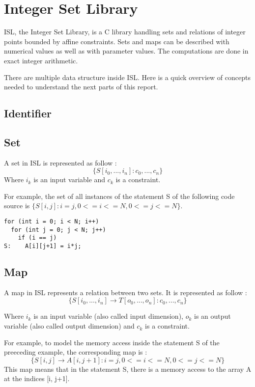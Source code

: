 \chapter{Integer Set Library}\label{ch:ISL}

ISL, the Integer Set Library, is a C library handling sets and relations of integer points bounded by affine constraints. Sets and maps can be described with numerical values as well as with parameter values. The computations are done in exact integer arithmetic. 

There are multiple data structure inside ISL. Here is a quick overview of concepts needed to understand the next parts of this report. 

\section{Identifier}

\section{Set}
A set in ISL is represented as follow :
\[
\{S[i_0,...,i_n]:c_0,...,c_n\}
\]
Where $i_k$ is an input variable and $c_k$ is a constraint.

For example, the set of all instances of the statement S of the following code source is $\{S[i,j]:i=j,0<=i<=N,0<=j<=N\}$.
\begin{lstlisting}[frame=single]
for (int i = 0; i < N; i++)
  for (int j = 0; j < N; j++)
    if (i == j)
S:    A[i][j+1] = i*j;
\end{lstlisting}

\section{Map}
A map in ISL represents a relation between two sets. It is represented as follow :
\[
\{S[i_0,...,i_n] \rightarrow T[o_0,...,o_n]:c_0,...,c_n\}
\]

Where $i_k$ is an input variable (also called input dimension), $o_k$ is an output variable (also called output dimension) and $c_k$ is a constraint.

For example, to model the memory access inside the statement S of the preeceding example, the corresponding map is :
\[
\{S[i,j] \rightarrow A[i,j+1]:i=j,0<=i<=N,0<=j<=N\}
\]
This map means that in the statement S, there is a memory access to the array A at the indices [i, j+1].

